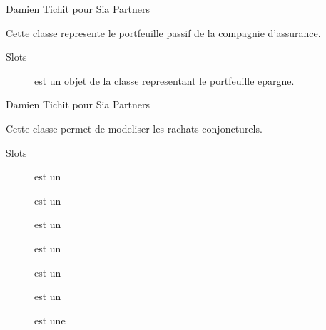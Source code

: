 \documentclass[a4paper]{book}
\begin{document}
%
\begin{Author}\relax
Damien Tichit pour Sia Partners
\end{Author}
%
\begin{Description}\relax
Cette classe represente le portfeuille passif de la compagnie d'assurance.
\end{Description}
%
\begin{Section}{Slots}

\begin{description}

\item[] est un objet de la classe  representant le portfeuille epargne.

\end{description}
\end{Section}
%
\begin{Author}\relax
Damien Tichit pour Sia Partners
\end{Author}
%
\begin{Description}\relax
Cette classe permet de modeliser les rachats conjoncturels.
\end{Description}
%
\begin{Section}{Slots}

\begin{description}

\item[] est un 

\item[] est un 

\item[] est un 

\item[] est un 

\item[] est un 

\item[] est un 

\item[] est une 

\end{description}
\end{Section}
%
\end{document}
